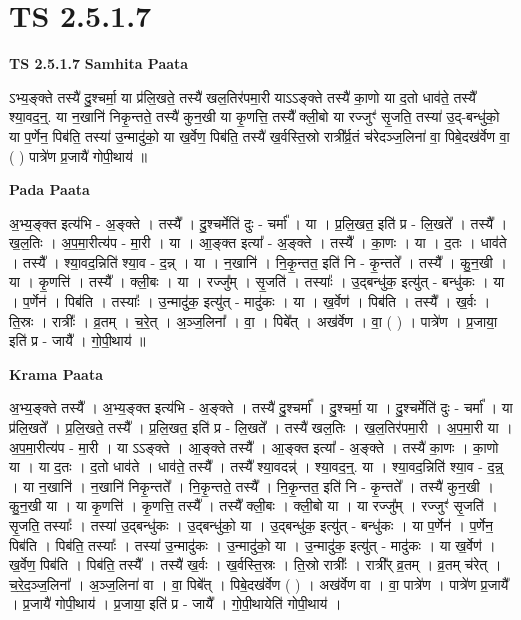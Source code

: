 \documentclass[17pt]{extarticle}
\begin{document}
\section*{ TS 2.5.1.7 }

\textbf{TS 2.5.1.7 } \newline
\textbf{Samhita Paata} \newline

ऽभ्य॒ङ्क्ते तस्यै॑ दु॒श्चर्मा॒ या प्र॑लि॒खते॒ तस्यै॑ खल॒तिर॑पमा॒री याऽऽङ्क्ते तस्यै॑ का॒णो या द॒तो धाव॑ते॒ तस्यै᳚ श्या॒वद॒न्॒. या न॒खानि॑ निकृ॒न्तते॒ तस्यै॑ कुन॒खी या कृ॒णत्ति॒ तस्यै᳚ क्ली॒बो या रज्जुꣳ॑ सृ॒जति॒ तस्या॑ उ॒द्-बन्धु॑को॒ या प॒र्णेन॒ पिब॑ति॒ तस्या॑ उ॒न्मादु॑को॒ या ख॒र्वेण॒ पिब॑ति॒ तस्यै॑ ख॒र्वस्ति॒स्रो रात्री᳚र्व्र॒तं च॑रेदञ्ज॒लिना॑ वा॒ पिबे॒दख॑र्वेण वा॒ ( ) पात्रे॑ण प्र॒जायै॑ गोपी॒थाय॑ ॥ \newline

\textbf{Pada Paata} \newline

अ॒भ्य॒ङ्क्त इत्य॑भि - अ॒ङ्क्ते । तस्यै᳚ । दु॒श्चर्मेति॑ दुः - चर्मा᳚ । या । प्र॒लि॒खत॒ इति॑ प्र - लि॒खते᳚ । तस्यै᳚ । ख॒ल॒तिः । अ॒प॒मा॒रीत्य॑प - मा॒री । या । आ॒ङ्क्त इत्या᳚ - अ॒ङ्क्ते । तस्यै᳚ । का॒णः । या । द॒तः । धाव॑ते । तस्यै᳚ । श्या॒वद॒न्निति॑ श्या॒व - द॒न्न् । या । न॒खानि॑ । नि॒कृ॒न्तत॒ इति॑ नि - कृ॒न्तते᳚ । तस्यै᳚ । कु॒न॒खी । या । कृ॒णत्ति॑ । तस्यै᳚ । क्ली॒बः । या । रज्जु᳚म् । सृ॒जति॑ । तस्याः᳚ । उ॒द्बन्धु॑क॒ इत्यु॑त् - बन्धु॑कः । या । प॒र्णेन॑ । पिब॑ति । तस्याः᳚ । उ॒न्मादु॑क॒ इत्यु॑त् - मादु॑कः । या । ख॒र्वेण॑ । पिब॑ति । तस्यै᳚ । ख॒र्वः । ति॒स्रः । रात्रीः᳚ । व्र॒तम् । च॒रे॒त् । अ॒ञ्ज॒लिना᳚ । वा॒ । पिबे᳚त् । अख॑र्वेण । वा॒ ( ) । पात्रे॑ण । प्र॒जाया॒ इति॑ प्र - जायै᳚ । गो॒पी॒थाय॑ ॥  \newline


\textbf{Krama Paata} \newline

अ॒भ्य॒ङ्क्ते तस्यै᳚ । अ॒भ्य॒ङ्क्त इत्य॑भि - अ॒ङ्क्ते । तस्यै॑ दु॒श्चर्मा᳚ । दु॒श्चर्मा॒ या । दु॒श्चर्मेति॑ दुः - चर्मा᳚ । या प्र॑लि॒खते᳚ । प्र॒लि॒खते॒ तस्यै᳚ । प्र॒लि॒खत॒ इति॑ प्र - लि॒खते᳚ । तस्यै॑ खल॒तिः । ख॒ल॒तिर॑पमा॒री । अ॒प॒मा॒री या । अ॒प॒मा॒रीत्य॑प - मा॒री । या ऽऽङ्क्ते । आ॒ङ्क्ते तस्यै᳚ । आ॒ङ्क्त इत्या᳚ - अ॒ङ्क्ते । तस्यै॑ का॒णः । का॒णो या । या द॒तः । द॒तो धाव॑ते । धाव॑ते॒ तस्यै᳚ । तस्यै᳚ श्या॒वदन्न्॑ । श्या॒वद॒न्॒. या । श्या॒वद॒न्निति॑ श्या॒व - द॒न्न्॒ । या न॒खानि॑ । न॒खानि॑ निकृ॒न्तते᳚ । नि॒कृ॒न्तते॒ तस्यै᳚ । नि॒कृ॒न्तत॒ इति॑ नि - कृ॒न्तते᳚ । तस्यै॑ कुन॒खी । कु॒न॒खी या । या कृ॒णत्ति॑ । कृ॒णत्ति॒ तस्यै᳚ । तस्यै᳚ क्ली॒बः । क्ली॒बो या । या रज्जु᳚म् । रज्जुꣳ॑ सृ॒जति॑ । सृ॒जति॒ तस्याः᳚ । तस्या॑ उ॒द्बन्धु॑कः । उ॒द्बन्धु॑को॒ या । उ॒द्बन्धु॑क॒ इत्यु॑त् - बन्धु॑कः । या प॒र्णेन॑ । प॒र्णेन॒ पिब॑ति । पिब॑ति॒ तस्याः᳚ । तस्या॑ उ॒न्मादु॑कः । उ॒न्मादु॑को॒ या । उ॒न्मादु॑क॒ इत्यु॑त् - मादु॑कः । या ख॒र्वेण॑ । ख॒र्वेण॒ पिब॑ति । पिब॑ति॒ तस्यै᳚ । तस्यै॑ ख॒र्वः । ख॒र्वस्ति॒स्रः । ति॒स्रो रात्रीः᳚ । रात्री᳚र् व्र॒तम् । व्र॒तम् च॑रेत् । च॒रे॒द॒ञ्ज॒लिना᳚ । अ॒ञ्ज॒लिना॑ वा । वा॒ पिबे᳚त् । पिबे॒दख॑र्वेण ( ) । अख॑र्वेण वा । वा॒ पात्रे॑ण । पात्रे॑ण प्र॒जायै᳚ । प्र॒जायै॑ गोपी॒थाय॑ । प्र॒जाया॒ इति॑ प्र - जायै᳚ । गो॒पी॒थायेति॑ गोपी॒थाय॑ । \newline
\end{document}

